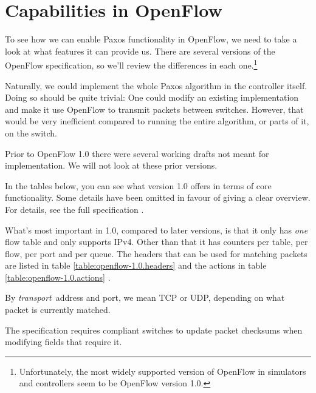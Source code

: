 \section{Capabilities in OpenFlow}
\label{chapter:details.openflow}


To see how we can enable Paxos functionality in OpenFlow, we need to take a
look at what features it can provide us.  There are several versions of the
OpenFlow specification, so we'll review the differences in each
one.\footnote{Unfortunately, the most widely supported version of OpenFlow in
simulators and controllers seem to be OpenFlow version 1.0.}

Naturally, we could implement the whole Paxos algorithm in the controller
itself.  Doing so should be quite trivial: One could modify an existing
implementation and make it use OpenFlow to transmit packets between
switches.  However, that would be very inefficient compared to running the
entire algorithm, or parts of it, on the switch.

Prior to OpenFlow 1.0 \cite{openflow-1.0} there were several working
drafts not meant for implementation.  We will not look at these prior
versions.

In the tables below, you can see what version 1.0 offers in terms of core
functionality.  Some details have been omitted in favour of giving a clear
overview.  For details, see the full specification \cite{openflow-1.0}.

What's most important in 1.0, compared to later versions, is that it only
has \textit{one} flow table and only supports IPv4.  Other than that it has
counters per table, per flow, per port and per queue.  The headers that can
be used for matching packets are listed in table
\ref{table:openflow-1.0.headers}  and
the actions in table \ref{table:openflow-1.0.actions}
.

By \textit{transport} address and port, we mean \ac{TCP} or \ac{UDP},
depending on what packet is currently matched.

The specification requires compliant switches to update packet checksums
when modifying fields that require it.

